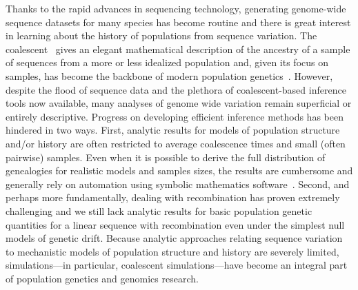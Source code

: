 \documentclass[graybox]{svmult}
\begin{document}
Thanks to the rapid advances in sequencing technology, generating
genome-wide sequence datasets for many species has become routine and
there is great interest in learning about the history of
populations from sequence variation. The
coalescent~\citep{hudson1983testing,kingman1982coalescent,Tajima1983Evolutionary}
gives an
elegant mathematical description of the ancestry of a sample of
sequences from a more or less idealized population and, given its focus
on samples, has become the backbone of modern population
genetics~\citep{hudson1990gene,wakely2008coalescent}.
However, despite the flood of sequence data and the plethora of
coalescent-based inference tools now available, many analyses of genome
wide variation remain superficial or entirely descriptive. Progress on
developing efficient inference methods has been hindered in two ways.
First, analytic results for models of population structure and/or history are
often restricted to average coalescence times and small (often pairwise)
samples. Even when it is possible to derive the full distribution of
genealogies for realistic models and samples sizes, the results are
cumbersome and generally rely on automation using symbolic mathematics software~\citep{Lohse2016}. Second, and
perhaps more fundamentally, dealing with recombination has proven
extremely challenging and we still lack analytic results for basic population genetic quantities for a linear sequence with recombination even under the simplest null models of
genetic drift.
Because analytic approaches relating sequence variation to mechanistic models
of population structure and history are severely limited, simulations---in particular, coalescent
simulations---have become an integral part of population genetics and genomics research.

\end{document}
